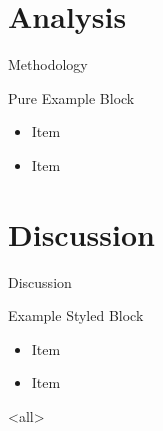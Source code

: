 \lipsum[5-7]

\section{Analysis}
\begin{frame}{Methodology}
  \begin{example}{Pure Example Block}
    \begin{itemize}
    \item Item
    \item Item
    \end{itemize}
  \end{example}
\end{frame}

\section{Discussion}
\begin{frame}{Discussion}
  \begin{exampleblock}{Example Styled Block}
    \begin{itemize}
    \item Item
    \item Item
    \end{itemize}
  \end{exampleblock}
\end{frame}

\lipsum

\mode<all>




